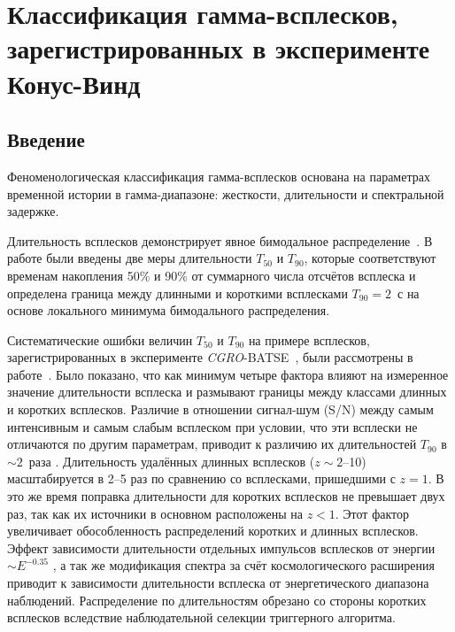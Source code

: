 \chapter{Классификация гамма-всплесков, зарегистрированных в эксперименте Конус-Винд}

\section{Введение}
Феноменологическая классификация  гамма-всплесков основана на параметрах 
временной истории в гамма-диапазоне: жесткости, длительности и спектральной задержке. 

Длительность всплесков демонстрирует явное бимодальное 
распределение~\citep{Mazets_1981_part_1,Norris_1984,Kouveliotou_1993,Aptekar_1998}. 
В работе \citep{Kouveliotou_1993} были введены две меры длительности $T_{50}$ и $T_{90}$, 
которые соответствуют временам накопления 50\% и 90\% от суммарного числа отсчётов 
всплеска и определена граница между длинными и короткими всплесками $T_{90}=2$~с 
на основе локального минимума бимодального распределения. 

Систематические ошибки величин $T_{50}$ и $T_{90}$ на примере всплесков, 
зарегистрированных в эксперименте \textit{CGRO}-BATSE~\citep{Fishman_1994}, 
были рассмотрены в работе~\citep{Norris_and_Bonnel_2006}. Было показано, 
что как минимум четыре фактора влияют на измеренное значение длительности 
всплеска и размывают границы между классами длинных и коротких всплесков. 
Различие в отношении сигнал-шум (S/N) между самым интенсивным и самым слабым 
всплеском  при условии, что эти всплески не отличаются по другим параметрам, 
приводит к различию их длительностей $T_{90}$ в $\sim2$~раза \citep{Bonnell_1997}. 
Длительность удалённых длинных всплесков ($z\sim2$--10)  масштабируется в 2--5 раз 
по сравнению со всплесками, пришедшими с $z=1$. В это же время поправка длительности 
для коротких всплесков не превышает двух раз, так как их источники в основном 
расположены на $z<1$. Этот фактор увеличивает обособленность распределений 
коротких и длинных всплесков. Эффект зависимости длительности отдельных импульсов 
всплесков от энергии $\sim E^{-0.35}$ \citep{Fenimore_1995}, а так же  модификация 
спектра за счёт космологического расширения приводит к зависимости длительности 
всплеска от энергетического диапазона наблюдений. Распределение по длительностям 
обрезано со стороны коротких всплесков вследствие наблюдательной селекции триггерного 
алгоритма. 

